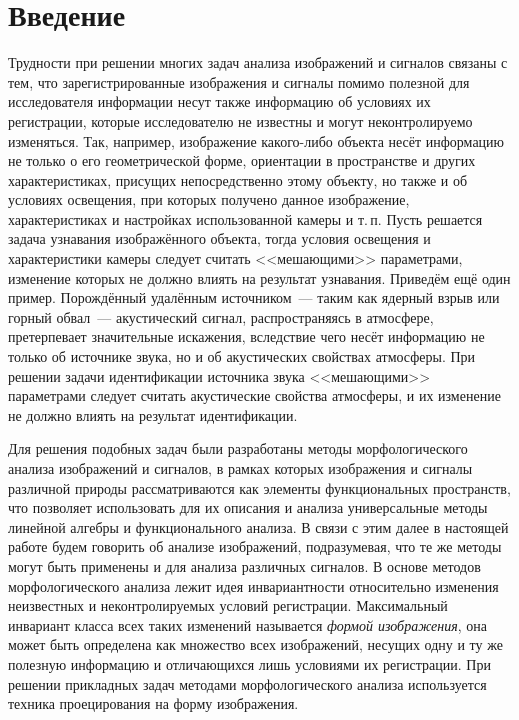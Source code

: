 \documentclass[a4paper, 12pt]{article}
\begin{document}
\section{Введение}
Трудности при решении многих задач анализа изображений и сигналов связаны с тем, что зарегистрированные изображения и сигналы помимо полезной для исследователя информации несут также информацию об условиях их регистрации, которые исследователю не известны и могут неконтролируемо изменяться. Так, например, изображение какого-либо объекта несёт информацию не только о его геометрической форме, ориентации в пространстве и других характеристиках, присущих непосредственно этому объекту, но также и об условиях освещения, при которых получено данное изображение, характеристиках и настройках использованной камеры и т.\,п. Пусть решается задача узнавания изображённого объекта, тогда условия освещения и характеристики камеры следует считать <<мешающими>> параметрами, изменение которых не должно влиять на результат узнавания. Приведём ещё один пример. Порождённый удалённым источником~--- таким как ядерный взрыв или горный обвал~--- акустический сигнал, распространяясь в атмосфере, претерпевает значительные искажения, вследствие чего несёт информацию не только об источнике звука, но и об акустических свойствах атмосферы. При решении задачи идентификации источника звука <<мешающими>> параметрами следует считать акустические свойства атмосферы, и их изменение не должно влиять на результат идентификации.

Для решения подобных задач были разработаны методы морфологического анализа изображений и сигналов, в рамках которых изображения и сигналы различной природы рассматриваются как элементы функциональных пространств, что позволяет использовать для их описания и анализа универсальные методы линейной алгебры и функционального анализа. В связи с этим далее в настоящей работе будем говорить об анализе изображений, подразумевая, что те же методы могут быть применены и для анализа различных сигналов. В основе методов морфологического анализа лежит идея инвариантности относительно изменения неизвестных и неконтролируемых условий регистрации. Максимальный инвариант класса всех таких изменений называется \emph{формой изображения}\cite{Pitiev_Zadachi_Morph_Analiza}, она может быть определена как множество всех изображений, несущих одну и ту же полезную информацию и отличающихся лишь условиями их регистрации. При решении прикладных задач методами морфологического анализа используется техника проецирования на форму изображения.
\end{document}
